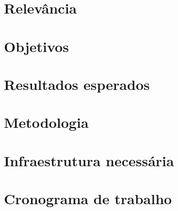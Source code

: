 \documentclass[a4paper,12pt]{article}
\begin{document}
\section{Relevância}
\section{Objetivos}
\section{Resultados esperados}
\section{Metodologia}
\section{Infraestrutura necessária}
\section{Cronograma de trabalho}

\cite{Kale:2010} \\
\cite{Manferdelli:2008} \\
\cite{Dean:2008} \\
\cite{Asanovic:2009}


\end{document}
